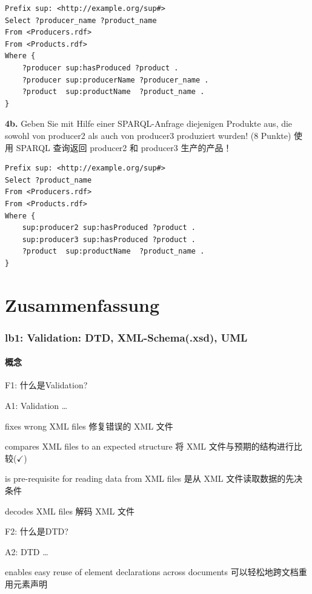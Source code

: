 \documentclass[fontset=windows]{article}
\begin{document}
\begin{verbatim}
Prefix sup: <http://example.org/sup#>
Select ?producer_name ?product_name
From <Producers.rdf>
From <Products.rdf>
Where {
	?producer sup:hasProduced ?product .
	?producer sup:producerName ?producer_name .
	?product  sup:productName  ?product_name .
}
\end{verbatim}

\textbf{4b. } Geben Sie mit Hilfe einer SPARQL-Anfrage diejenigen Produkte aus, die sowohl von producer2 als auch von producer3 produziert wurden!
(8 Punkte) 使用 SPARQL 查询返回 producer2 和 producer3 生产的产品！

\begin{verbatim}
Prefix sup: <http://example.org/sup#>
Select ?product_name
From <Producers.rdf>
From <Products.rdf>
Where {
	sup:producer2 sup:hasProduced ?product .
	sup:producer3 sup:hasProduced ?product . 
	?product  sup:productName  ?product_name .
}
\end{verbatim}


\newpage

\part*{Zusammenfassung}

\setcounter{section}{0}

\section{lb1: Validation: DTD, XML-Schema(.xsd), UML }

\subsection{概念}

F1: 什么是Validation?

A1: Validation \dots

\indent\indent fixes wrong XML files 修复错误的 XML 文件

\indent\indent compares XML files to an expected structure 将 XML 文件与预期的结构进行比较($\checkmark$)

\indent\indent is pre-requisite for reading data from XML files 是从 XML 文件读取数据的先决条件

\indent\indent decodes XML files 解码 XML 文件

F2: 什么是DTD?

A2: DTD \dots

\indent\indent enables easy reuse of element declarations across documents 可以轻松地跨文档重用元素声明
\end{document}

